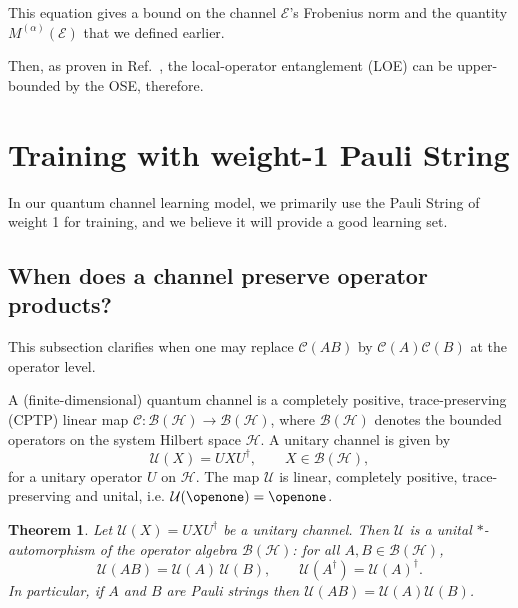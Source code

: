 \documentclass[%
 reprint,
superscriptaddress,
 amsmath,amssymb,
 aps,
]{revtex4-2}
\newcommand{\E}{\mathcal{E}}
\newtheorem{theorem}{Theorem}[section]
\begin{document}
This equation gives a bound on the channel $\E$'s Frobenius norm and the quantity $M^{(\alpha)}(\E)$ that we defined earlier.

Then, as proven in Ref.~\cite{Magic_measure1}, the local-operator entanglement (LOE) can be upper-bounded by the OSE, therefore.

\section{Training with weight-1 Pauli String}

In our quantum channel learning model, we primarily use the Pauli String of weight 1 for training, and we believe it will provide a good learning set.

\subsection{When does a channel preserve operator products?}

This subsection clarifies when one may replace $\mathcal{C}(AB)$ by $\mathcal{C}(A)\mathcal{C}(B)$ at the
operator level.

A (finite-dimensional) quantum channel is a completely positive,
trace-preserving (CPTP) linear map
\(\mathcal{C}:\mathcal{B}(\mathcal{H})\to\mathcal{B}(\mathcal{H})\),
where $\mathcal{B}(\mathcal{H})$ denotes the bounded operators on the system Hilbert space $\mathcal{H}$. A unitary channel is given by
\begin{equation}
  \mathcal{U}(X) = U X U^{\dagger},
  \qquad X\in\mathcal{B}(\mathcal{H}),
\end{equation}
for a unitary operator $U$ on $\mathcal{H}$. The map $\mathcal{U}$ is linear, completely positive, trace-preserving
and unital, i.e. $\mathcal{U}(\openone)=\openone$.

\begin{theorem}
Let $\mathcal{U}(X)=UXU^{\dagger}$ be a unitary channel. Then
$\mathcal{U}$ is a unital $*$-automorphism of the operator algebra
$\mathcal{B}(\mathcal{H})$: for all $A,B\in\mathcal{B}(\mathcal{H})$,
\begin{equation}
  \mathcal{U}(AB)=\mathcal{U}(A)\,\mathcal{U}(B),
  \qquad
  \mathcal{U}(A^{\dagger})=\mathcal{U}(A)^{\dagger}.
\end{equation}
In particular, if $A$ and $B$ are Pauli strings then
$\mathcal{U}(AB)=\mathcal{U}(A)\mathcal{U}(B)$.
\end{theorem}
\end{document}
